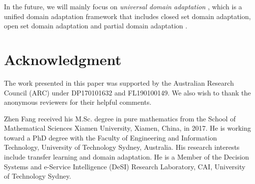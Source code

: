\documentclass[journal]{IEEEtran}
\begin{document}
In the future, we will mainly focus on \textit{universal domain adaptation} \cite{longmingsheng1}, which is a unified domain adaptation framework that includes closed set domain adaptation, open set domain adaptation and partial domain adaptation \cite{DBLP:conf/cvpr/CaoL0J18} .
















\section*{Acknowledgment}


The  work  presented  in  this  paper  was  supported  by  the Australian Research Council (ARC) under DP170101632 and FL190100149.  We also wish to thank the anonymous reviewers for their helpful comments.


\ifCLASSOPTIONcaptionsoff
  \newpage
\fi












\vspace{-1.4cm}
\begin{IEEEbiography}{Zhen Fang}
received his M.Sc. degree in pure mathematics from the School of Mathematical Sciences Xiamen University, Xiamen, China, in 2017. He is working toward a PhD degree with the Faculty of Engineering and Information Technology, University of Technology Sydney, Australia. His research interests include transfer learning and domain adaptation. He is a Member of the Decision Systems and e-Service Intelligence (DeSI) Research Laboratory, CAI, University of Technology Sydney.
\end{IEEEbiography}
\end{document}
